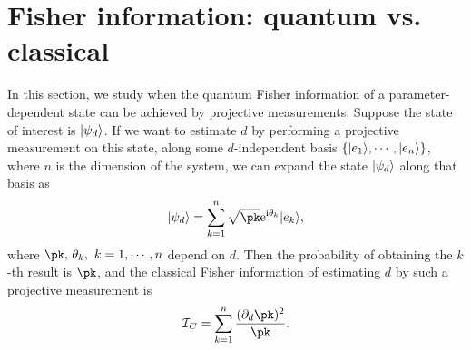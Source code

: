 \section{Fisher information: quantum vs. classical}\label{sec:fisher}

In this section, we study when the quantum Fisher information of
a parameter-dependent state can be achieved by projective measurements.
Suppose the state of interest is $|\psi_{d}\rangle$. If we want to estimate $d$
by performing a projective measurement on this state, along some $d$-independent
basis $\{|e_{1}\rangle,\cdots,|e_{n}\rangle\}$, where $n$ is the dimension of
the system, we can expand the state $|\psi_{d}\rangle$ along that basis as
\begin{equation}
\kd=\sk\sqrt{\pk}\et\bas k,\label{eq:state sd}
\end{equation}
where $\pk,\,\tk,\,\,k=1,\cdots,n$ depend on $d$. Then the probability
of obtaining the $k$-th result is $\pk$, and the classical Fisher
information of estimating $d$ by such a projective measurement is
\begin{equation}
\ic=\sk\frac{(\pd\pk)^{2}}{\pk}.\label{eq:cfi}
\end{equation}


